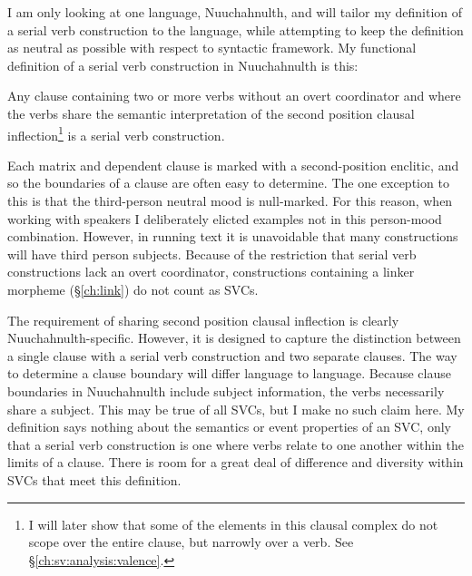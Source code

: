 I am only looking at one language, Nuuchahnulth, and will tailor my definition of a serial verb construction to the language, while attempting to keep the definition as neutral as possible with respect to syntactic framework.
My functional definition of a serial verb construction in Nuuchahnulth is this:

\ex \label{svcdef}
Any clause containing two or more verbs without an overt coordinator and where the verbs share the semantic interpretation of the second position clausal inflection\footnote{I will later show that some of the elements in this clausal complex do not scope over the entire clause, but narrowly over a verb. See \S\ref{ch:sv:analysis:valence}.} is a serial verb construction.
\xe

Each matrix and dependent clause is marked with a second-position enclitic, and so the boundaries of a clause are often easy to determine. The one exception to this is that the third-person neutral mood is null-marked. For this reason, when working with speakers I deliberately elicted examples not in this person-mood combination. However, in running text it is unavoidable that many constructions will have third person subjects. Because of the restriction that serial verb constructions lack an overt coordinator, constructions containing a linker morpheme (\S\ref{ch:link}) do not count as SVCs.

The requirement of sharing second position clausal inflection is clearly Nuuchahnulth-specific. However, it is designed to capture the distinction between a single clause with a serial verb construction and two separate clauses. The way to determine a clause boundary will differ language to language. Because clause boundaries in Nuuchahnulth include subject information, the verbs necessarily share a subject. This may be true of all SVCs, but I make no such claim here. My definition says nothing about the semantics or event properties of an SVC, only that a serial verb construction is one where verbs relate to one another within the limits of a clause. There is room for a great deal of difference and diversity within SVCs that meet this definition.%


